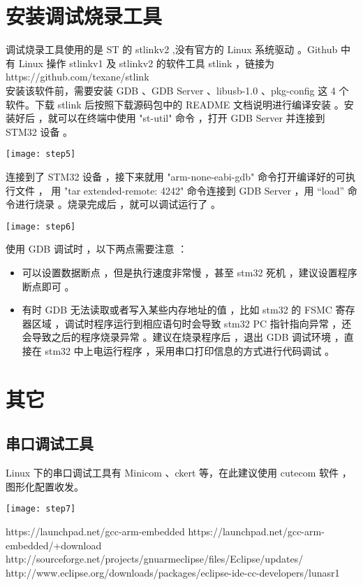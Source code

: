 \documentclass{article}
\begin{document}
\section{安装调试烧录工具}
\label{sec:安装调试烧录工具}

调试烧录工具使用的是 ST 的 stlinkv2 ,没有官方的 Linux 系统驱动 。Github 中有 Linux 操作 stlinkv1 及 stlinkv2 的软件工具 stlink ，链接为 \\
https://github.com/texane/stlink \\
安装该软件前，需要安装 GDB 、GDB Server 、libusb-1.0 、pkg-config 这 4 个软件。下载 stlink 后按照下载源码包中的 README 文档说明进行编译安装 。安装好后 ，就可以在终端中使用 "st-util" 命令 ，打开 GDB Server 并连接到 STM32 设备 。
\begin{center}
  \texttt{[image: step5]}
\end{center}

连接到了 STM32 设备 ，接下来就用 "arm-none-eabi-gdb" 命令打开编译好的可执行文件 ，
用 "tar extended-remote: 4242" 命令连接到 GDB Server ，用 “load” 命令进行烧录 。烧录完成后 ，就可以调试运行了 。
\begin{center}
  \texttt{[image: step6]}
\end{center}

使用 GDB 调试时 ，以下两点需要注意 ：
\begin{itemize}
\item 可以设置数据断点 ，但是执行速度非常慢 ，甚至 stm32 死机 ，建议设置程序断点即可 。
\end{itemize}
\begin{itemize}
\item 有时 GDB 无法读取或者写入某些内存地址的值 ，比如 stm32 的 FSMC 寄存器区域 ，调试时程序运行到相应语句时会导致 stm32 PC 指针指向异常 ，还会导致之后的程序烧录异常 。建议在烧录程序后 ，退出 GDB 调试环境 ，直接在 stm32 中上电运行程序 ，采用串口打印信息的方式进行代码调试 。
\end{itemize}

\section{其它}
\label{sec:其它}

\subsection*{串口调试工具}
\label{sec:串口调试工具}

Linux 下的串口调试工具有 Minicom 、ckert 等，在此建议使用 cutecom 软件 ，图形化配置收发。
\begin{center}
  \texttt{[image: step7]}
\end{center}
\begin{thebibliography}{}
  https://launchpad.net/gcc-arm-embedded
  https://launchpad.net/gcc-arm-embedded/+download
  http://sourceforge.net/projects/gnuarmeclipse/files/Eclipse/updates/
  http://www.eclipse.org/downloads/packages/eclipse-ide-cc-developers/lunasr1
\end{thebibliography}
\end{document}
